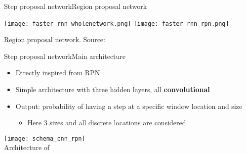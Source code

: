 \begin{frame}{Step proposal network}{Region proposal network}
\begin{minipage}[t]{0.54\linewidth}
\renewcommand{\ratio}{0.45}
    \centering
    \texttt{[image: faster\_rnn\_wholenetwork.png]}
    \texttt{[image: faster\_rnn\_rpn.png]}\\
    \smallskip
    \centerline{\small Region proposal network. Source: \citet{ren2015faster}}

\end{minipage}

\end{frame}



\begin{frame}{Step proposal network}{Main architecture}

\begin{itemize}
    \item Directly inspired from RPN
    \item Simple architecture with three hidden layers, all \textbf{convolutional}
    \item Output: probability of having a step at a specific window location and size
    \begin{itemize}
    \item Here 3 sizes and all discrete locations are considered
    \end{itemize}
\end{itemize}

    \begin{minipage}{\linewidth}
        \centering
        \texttt{[image: schema\_cnn\_rpn]}\\
        \smallskip
        {\small Architecture of \subalgo}
    \end{minipage}
    
\end{frame}


